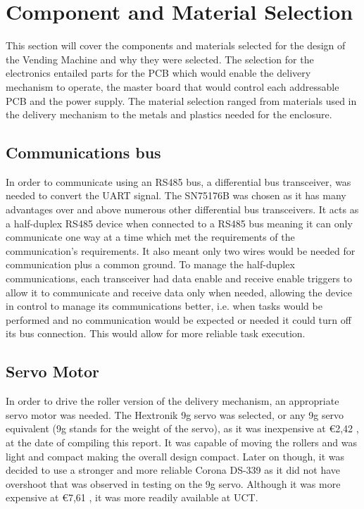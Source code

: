 \documentclass[a4paper,11pt]{article}
\numberwithin{figure}{section}
\numberwithin{table}{section}
\begin{document}
\newpage
\section{Component and Material Selection}\thispagestyle{sectionstart}
This section will cover the components and materials selected for the design of the Vending Machine and why they were selected. The selection for the electronics entailed parts for the PCB which would enable the delivery mechanism to operate, the master board that would control each addressable PCB and the power supply. The material selection ranged from materials used in the delivery mechanism to the metals and plastics needed for the enclosure.

\subsection{Communications bus}
\label{subsec:bus}
In order to communicate using an RS485 bus, a differential bus transceiver, was needed to convert the UART signal. The SN75176B was chosen as it has many advantages over and above numerous other differential bus transceivers. It acts as a half-duplex RS485 device when connected to a RS485 bus meaning it can only communicate one way at a time which met the requirements of the communication's requirements. It also meant only two wires would be needed for communication plus a common ground. To manage the half-duplex communications, each transceiver had data enable and receive enable triggers to allow it to communicate and receive data only when needed, allowing the device in control to manage its communications better, i.e. when tasks would be performed and no communication would be expected or needed it could turn off its bus connection. This would allow for more reliable task execution.

\subsection{Servo Motor}
In order to drive the roller version of the delivery mechanism, an appropriate servo motor was needed. The Hextronik 9g servo was selected, or any 9g servo equivalent (9g stands for the weight of the servo), as it was inexpensive at \euro 2,42 \cite{hobbyking}, at the date of compiling this report. It was capable of moving the rollers and was light and compact making the overall design compact. Later on though, it was decided to use a stronger and more reliable Corona DS-339 as it did not have overshoot that was observed in testing on the 9g servo. Although it was more expensive at \euro 7,61 \cite{hobbyking}, it was more readily available at UCT.
\end{document}
